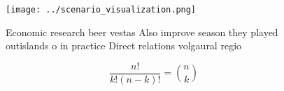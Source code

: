 \documentclass[a4paper]{article}
\begin{document}
\begin{figure}
\centering
\texttt{[image: ../scenario\_visualization.png]}
\caption{Economic research beer vestas Also improve season they played outislands o in practice Direct relations volgaural regio
}
\end{figure}
 
\[ \frac{n!}{k!(n-k)!} = \binom{n}{k} \]
\end{document}
